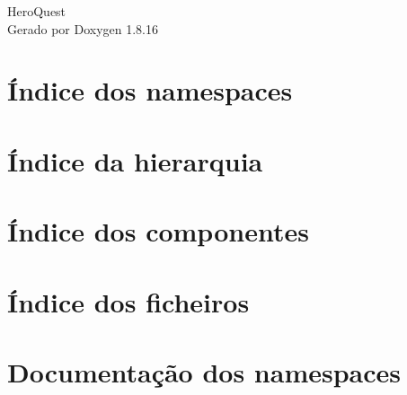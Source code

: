 \let\mypdfximage\pdfximage\def\pdfximage{\immediate\mypdfximage}\documentclass[twoside]{book}
\newcommand{\+}{\discretionary{\mbox{\scriptsize$\hookleftarrow$}}{}{}}
\newcommand{\clearemptydoublepage}{%
  \newpage{\pagestyle{empty}\cleardoublepage}%
}
\begin{document}
\hypersetup{pageanchor=false,
             bookmarksnumbered=true,
             pdfencoding=unicode
            }
\begin{titlepage}
\vspace*{7cm}
\begin{center}%
{\Large Hero\+Quest }\\
\vspace*{1cm}
{\large Gerado por Doxygen 1.8.16}\\
\end{center}
\end{titlepage}
\clearemptydoublepage
{}
\tableofcontents
\clearemptydoublepage
{}
\hypersetup{pageanchor=true}

\chapter{Índice dos namespaces}

\chapter{Índice da hierarquia}

\chapter{Índice dos componentes}

\chapter{Índice dos ficheiros}

\chapter{Documentação dos namespaces}




















\end{document}
